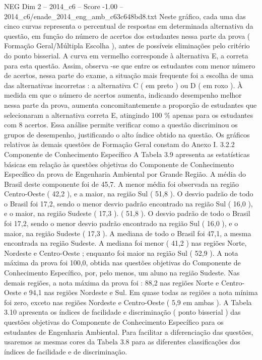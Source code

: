 \begin{textsample}{NEG Dim 2 – 2014\_c6 – Score -1.00 – 2014\_c6/enade\_2014\_eng\_amb\_c63c648bd8.txt}
Neste gráfico, cada uma das cinco curvas representa o percentual de respostas em determinada alternativa da questão, em função do número de acertos dos estudantes nessa parte da prova ( Formação Geral/Múltipla Escolha ), antes de possíveis eliminações pelo critério do ponto bisserial.
A curva em vermelho corresponde à alternativa E, a correta para esta questão.
Assim, observa -se que entre os estudantes com menor número de acertos, nessa parte do exame, a situação mais frequente foi a escolha de uma das alternativas incorretas : a alternativa C ( em preto ) ou D ( em roxo ).
À medida em que o número de acertos aumenta, indicando desempenho melhor nessa parte da prova, aumenta concomitantemente a proporção de estudantes que selecionaram a alternativa correta E, atingindo 100 \% apenas para os estudantes com 8 acertos.
Essa análise permite verificar como a questão discriminou os grupos de desempenho, justificando o alto índice obtido na questão.
Os gráficos relativos às demais questões de Formação Geral constam do Anexo I. 3.2.2 Componente de Conhecimento Específico A Tabela 3.9 apresenta as estatísticas básicas em relação às questões objetivas do Componente de Conhecimento Específico da prova de Engenharia Ambiental por Grande Região.
A média do Brasil deste componente foi de 45,7.
A menor média foi observada na região Centro-Oeste ( 42,2 ), e a maior, na região Sul ( 51,8 ).
O desvio padrão de todo o Brasil foi 17,2, sendo o menor desvio padrão encontrado na região Sul ( 16,0 ), e o maior, na região Sudeste ( 17,3 ). ( 51,8 ).
O desvio padrão de todo o Brasil foi 17,2, sendo o menor desvio padrão encontrado na região Sul ( 16,0 ), e o maior, na região Sudeste ( 17,3 ).
A mediana de todo o Brasil foi 47,1, a mesma encontrada na região Sudeste.
A mediana foi menor ( 41,2 ) nas regiões Norte, Nordeste e Centro-Oeste ; enquanto foi maior na região Sul ( 52,9 ).
A nota máxima da prova foi 100,0, obtida nas questões objetivas do Componente de Conhecimento Específico, por, pelo menos, um aluno na região Sudeste.
Nas demais regiões, a nota máxima da prova foi : 88,2 nas regiões Norte e Centro-Oeste e 94,1 nas regiões Nordeste e Sul.
Em quase todas as regiões a nota mínima foi zero, exceto nas regiões Nordeste e Centro-Oeste ( 5,9 em ambas ).
A Tabela 3.10 apresenta os índices de facilidade e discriminação ( ponto bisserial ) das questões objetivas do Componente de Conhecimento Específico para os estudantes de Engenharia Ambiental.
Para facilitar a diferenciação das questões, usaremos as mesmas cores da Tabela 3.8 para as diferentes classificações dos índices de facilidade e de discriminação.

\end{textsample}
